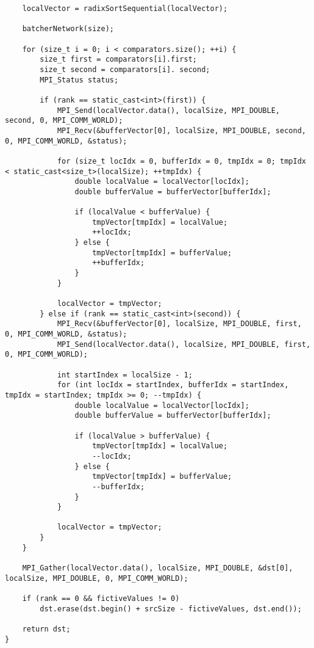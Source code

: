 \documentclass{report}
\begin{document}
\begin{lstlisting}
    localVector = radixSortSequential(localVector);

    batcherNetwork(size);

    for (size_t i = 0; i < comparators.size(); ++i) {
        size_t first = comparators[i].first;
        size_t second = comparators[i]. second;
        MPI_Status status;

        if (rank == static_cast<int>(first)) {
            MPI_Send(localVector.data(), localSize, MPI_DOUBLE, second, 0, MPI_COMM_WORLD);
            MPI_Recv(&bufferVector[0], localSize, MPI_DOUBLE, second, 0, MPI_COMM_WORLD, &status);

            for (size_t locIdx = 0, bufferIdx = 0, tmpIdx = 0; tmpIdx < static_cast<size_t>(localSize); ++tmpIdx) {
                double localValue = localVector[locIdx];
                double bufferValue = bufferVector[bufferIdx];

                if (localValue < bufferValue) {
                    tmpVector[tmpIdx] = localValue;
                    ++locIdx;
                } else {
                    tmpVector[tmpIdx] = bufferValue;
                    ++bufferIdx;
                }
            }

            localVector = tmpVector;
        } else if (rank == static_cast<int>(second)) {
            MPI_Recv(&bufferVector[0], localSize, MPI_DOUBLE, first, 0, MPI_COMM_WORLD, &status);
            MPI_Send(localVector.data(), localSize, MPI_DOUBLE, first, 0, MPI_COMM_WORLD);

            int startIndex = localSize - 1;
            for (int locIdx = startIndex, bufferIdx = startIndex, tmpIdx = startIndex; tmpIdx >= 0; --tmpIdx) {
                double localValue = localVector[locIdx];
                double bufferValue = bufferVector[bufferIdx];

                if (localValue > bufferValue) {
                    tmpVector[tmpIdx] = localValue;
                    --locIdx;
                } else {
                    tmpVector[tmpIdx] = bufferValue;
                    --bufferIdx;
                }
            }

            localVector = tmpVector;
        }
    }

    MPI_Gather(localVector.data(), localSize, MPI_DOUBLE, &dst[0], localSize, MPI_DOUBLE, 0, MPI_COMM_WORLD);

    if (rank == 0 && fictiveValues != 0)
        dst.erase(dst.begin() + srcSize - fictiveValues, dst.end());

    return dst;
}


\end{lstlisting}
\end{document}
